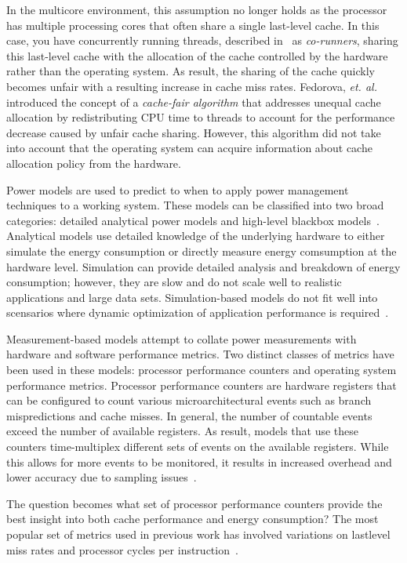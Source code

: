 \documentclass[12pt,onecolumn]{ULieeetran}
\begin{document}
In the multicore environment, this assumption no longer holds as the
processor has multiple processing cores that often share a single
last-level cache.  In this case, you have concurrently running threads,
described in~\cite{Fedorova2008} as \textit{co-runners}, sharing this
last-level cache with the allocation of the cache controlled by the
hardware rather than the operating system.   As result, the sharing of
the cache quickly becomes unfair with a resulting increase in cache miss
rates. Fedorova, \textit{et. al.}~\cite{Fedorova2008} introduced the
concept of a \textit{cache-fair algorithm} that addresses unequal cache
allocation by redistributing CPU time to threads to account for the
performance decrease caused by unfair cache sharing.   However, this
algorithm did not take into account that the operating system can
acquire information about cache allocation policy from the hardware.

Power models are used to predict to when to apply power management techniques
to a working system. These models can be classified into two
broad categories: detailed analytical power models and high-level
blackbox models~\cite{Rivoire2008b}. Analytical models use detailed
knowledge of the underlying hardware to either simulate the energy
consumption or directly measure energy comsumption at the hardware
level.  Simulation can provide detailed analysis and breakdown of energy
consumption; however, they are slow and do not scale well to realistic
applications and large data sets.  Simulation-based models do not fit
well into scensarios where dynamic optimization of application
performance is required~\cite{Economou2006}.

Measurement-based models attempt to collate power measurements with
hardware and software performance metrics.  Two distinct classes of
metrics have been used in these models: processor performance counters
and operating system performance metrics.  Processor performance
counters are hardware registers that can be configured to count various
microarchitectural events such as branch mispredictions and cache
misses.  In general, the number of countable events exceed the number of
available registers.  As result, models that use these counters
time-multiplex different sets of events on the available registers.
While this allows for more events to be monitored, it results in
increased overhead and lower accuracy due to sampling
issues~\cite{Economou2006}\cite{Rivoire2008a}.

The question becomes what set of processor performance counters provide
the best insight into both cache performance and energy consumption?
The most popular set of metrics used in previous work has involved
variations on lastlevel miss rates and processor cycles per
instruction~\cite{Tam2007}\cite{Banikazemi2008}.    
\end{document}

